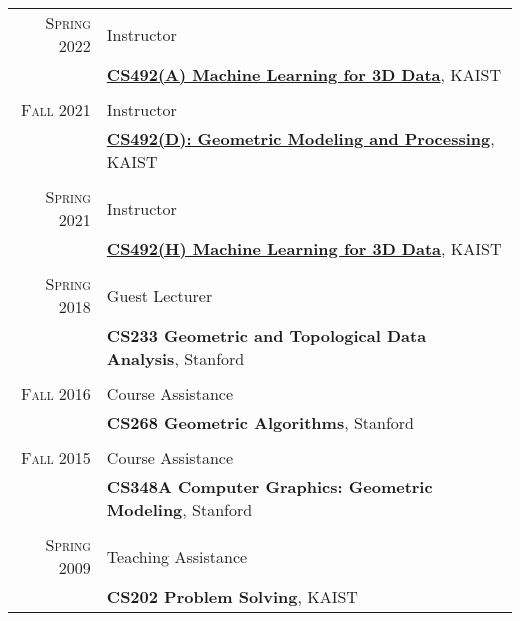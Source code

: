 \documentclass[letterpaper,10pt]{article} %
\begin{document}
{{\begin{tabular}{r|p{11cm}}

\textsc{Spring 2022} & Instructor\\
& \href{https://mhsung.github.io/kaist-cs492a-spring-2022/}{\textbf{CS492(A) Machine Learning for 3D Data}}, KAIST\\
& \\


\textsc{Fall 2021} & Instructor\\
& \href{https://mhsung.github.io/kaist-cs492d-fall-2021/}{\textbf{CS492(D): Geometric Modeling and Processing}}, KAIST\\
& \\


\textsc{Spring 2021} & Instructor\\
& \href{https://mhsung.github.io/courses/kaist-cs492h-spring-2021/}{\textbf{CS492(H) Machine Learning for 3D Data}}, KAIST\\
& \\


\textsc{Spring 2018} & Guest Lecturer\\
& \textbf{CS233 Geometric and Topological Data Analysis}, Stanford\\
& \\


\textsc{Fall 2016} & Course Assistance\\
& \textbf{CS268 Geometric Algorithms}, Stanford\\
& \\


\textsc{Fall 2015} & Course Assistance\\
& \textbf{CS348A Computer Graphics: Geometric Modeling}, Stanford\\
& \\


\textsc{Spring 2009} & Teaching Assistance\\
& \textbf{CS202 Problem Solving}, KAIST\\
\end{tabular}\\

}}
\end{document}
